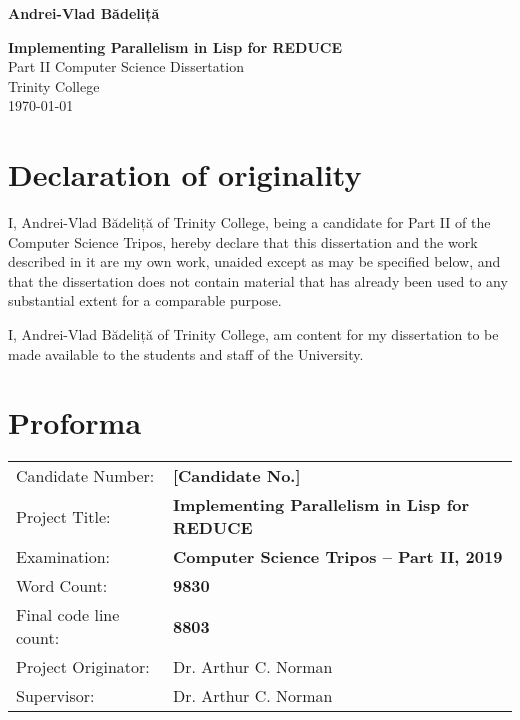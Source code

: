 \documentclass[a4paper,12pt,twoside,openright]{report}
\date{\today}
\title{}
\begin{document}

\hfill{\LARGE \bf Andrei-Vlad Bădeliță}

\pagestyle{empty}

\vspace*{60mm}
\begin{center}
\Huge{\bf Implementing Parallelism in Lisp for REDUCE} \\
\vspace*{5mm}
Part II Computer Science Dissertation \\
\vspace*{5mm}
Trinity College \\
\vspace*{5mm}
\today  %
\end{center}

\cleardoublepage


\pagestyle{plain}

\section*{Declaration of originality}

I, Andrei-Vlad Bădeliță of Trinity College, being a candidate for Part II of the
Computer Science Tripos, hereby declare that this dissertation and the work described
in it are my own work, unaided except as may be specified below, and that the
dissertation does not contain material that has already been used to any
substantial extent for a comparable purpose.

\medskip
\noindent
I, Andrei-Vlad Bădeliță of Trinity College, am content for my dissertation
to be made available to the students and staff of the University.

\bigskip
{}

\medskip
{}

\section*{Proforma}

{\large
\begin{tabular}{ll}
Candidate Number:   & \bf [Candidate No.]                       \\
Project Title:      & \bf Implementing Parallelism in Lisp for REDUCE   \\
Examination:        & \bf Computer Science Tripos -- Part II, 2019  \\
Word Count:         & \bf 9830        \\
Final code line count:   & \bf 8803        \\
Project Originator: & Dr. Arthur C. Norman                    \\
Supervisor:         & Dr. Arthur C. Norman                    \\
\end{tabular}
}
\end{document}

